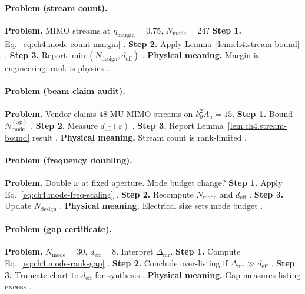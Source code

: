 \paragraph{Problem (stream count).}
\textbf{Problem.} MIMO streams at \(\eta_{\mathrm{margin}}=0.75\), \(N_{\mathrm{mode}}=24\)?
\textbf{Step 1.} Eq.~\eqref{eq:ch4.mode-count-margin} \cite{hansen1988,harrington2001}.
\textbf{Step 2.} Apply Lemma~\ref{lem:ch4.stream-bound} \cite{devaney2004,collin2001}.
\textbf{Step 3.} Report \(\min(N_{\mathrm{design}},d_{\mathrm{eff}})\) \cite{stratton1941}.
\textbf{Physical meaning.} Margin is engineering; rank is physics \cite{harrington2001}.

\paragraph{Problem (beam claim audit).}
\textbf{Problem.} Vendor claims \(48\) MU-MIMO streams on \(k_{0}^{2}A_{a}=15\).
\textbf{Step 1.} Bound \(N_{\mathrm{mode}}^{\mathrm{(ap)}}\) \cite{jackson1999,hansen1988}.
\textbf{Step 2.} Measure \(d_{\mathrm{eff}}(\varepsilon)\) \cite{harrington2001,devaney2004}.
\textbf{Step 3.} Report Lemma~\ref{lem:ch4.stream-bound} result \cite{stratton1941,collin2001}.
\textbf{Physical meaning.} Stream count is rank-limited \cite{hansen1988}.

\paragraph{Problem (frequency doubling).}
\textbf{Problem.} Double \(\omega\) at fixed aperture. Mode budget change?
\textbf{Step 1.} Apply Eq.~\eqref{eq:ch4.mode-freq-scaling} \cite{jackson1999,hansen1988}.
\textbf{Step 2.} Recompute \(N_{\mathrm{mode}}\) and \(d_{\mathrm{eff}}\) \cite{harrington2001,devaney2004}.
\textbf{Step 3.} Update \(N_{\mathrm{design}}\) \cite{stratton1941,collin2001}.
\textbf{Physical meaning.} Electrical size sets mode budget \cite{harrington2001}.

\paragraph{Problem (gap certificate).}
\textbf{Problem.} \(N_{\mathrm{mode}}=30\), \(d_{\mathrm{eff}}=8\). Interpret \(\Delta_{\mathrm{mr}}\).
\textbf{Step 1.} Compute Eq.~\eqref{eq:ch4.mode-rank-gap} \cite{hansen1988,devaney2004}.
\textbf{Step 2.} Conclude over-listing if \(\Delta_{\mathrm{mr}}\gg d_{\mathrm{eff}}\) \cite{harrington2001,stratton1941}.
\textbf{Step 3.} Truncate chart to \(d_{\mathrm{eff}}\) for synthesis \cite{devaney2004}.
\textbf{Physical meaning.} Gap measures listing excess \cite{hansen1988}.

